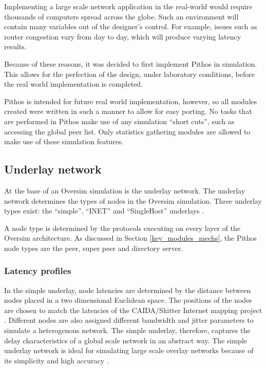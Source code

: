 Implementing a large scale network application in the real-world would require thousands of computers spread across the globe. Such an environment will contain many variables out of the designer's control. For example, issues such as router congestion vary from day to day, which will produce varying latency results.

Because of these reasons, it was decided to first implement Pithos in simulation. This allows for the perfection of the design, under laboratory conditions, before the real world implementation is completed.

Pithos is intended for future real world implementation, however, so all modules created were written in such a manner to allow for easy porting. No tasks that are performed in Pithos make use of any simulation ``short cuts'', such as accessing the global peer list. Only statistics gathering modules are allowed to make use of these simulation features.

\subsection{Underlay network}
\label{oversim_underlay}

At the base of an Oversim simulation is the underlay network. The underlay network determines the types of nodes in the Oversim simulation. Three underlay types exist: the ``simple'', ``INET'' and ``SingleHost'' underlays \cite{oversim_applications}.

A node type is determined by the protocols executing on every layer of the Oversim architecture. As discussed in Section \ref{key_modules_mechs}, the Pithos node types are the peer, super peer and directory server.

\subsubsection{Latency profiles}
In the simple underlay, node latencies are determined by the distance between nodes placed in a two dimensional Euclidean space. The positions of the nodes are chosen to match the latencies of the CAIDA/Skitter Internet mapping project \cite{caida_skitter}. Different nodes are also assigned different bandwidth and jitter parameters to simulate a heterogenous network. The simple underlay, therefore, captures the delay characteristics of a global scale network in an abstract way. The simple underlay network is ideal for simulating large scale overlay networks because of its simplicity and high accuracy \cite{oversim_applications}.

